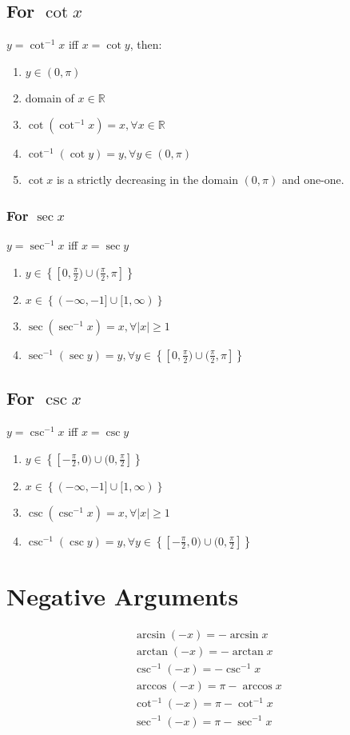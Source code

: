 \subsection{For $\cot x$}
$y=\cot^{-1} x$ iff $x=\cot y$, then:
\begin{enumerate}
	\item $y \in (0,\pi)$
	\item domain of $x \in \mathbb{R}$
	\item $\cot(\cot^{-1} x)=x,\forall x\in\mathbb{R}$
	\item $\cot^{-1}(\cot y)=y, \forall y\in (0,\pi)$
	\item $\cot x$ is a strictly decreasing in the domain $(0,\pi)$ and one-one.
\end{enumerate}

\subsubsection{For $\sec x$}
$y=\sec^{-1} x$ iff $x=\sec y$
\begin{enumerate}
	\item $y\in\left\lbrace [0,\frac{\pi}{2})\cup(\frac{\pi}{2},\pi]\right\rbrace$
	\item $x\in\left\lbrace(-\infty,-1]\cup[1,\infty)\right\rbrace$
	\item $\sec(\sec^{-1}x)=x,\forall \lvert x \rvert \geq 1$
	\item $\sec^{-1}(\sec y)=y, \forall y \in \left\lbrace [0,\frac{\pi}{2})\cup(\frac{\pi}{2},\pi]\right\rbrace$
\end{enumerate}

\subsection{For $\csc x$}
$y=\csc^{-1} x$ iff $x=\csc y$
\begin{enumerate}
	\item $y\in\left\lbrace [-\frac{\pi}{2},0)\cup(0,\frac{\pi}{2}]\right\rbrace$
	\item $x\in\left\lbrace(-\infty,-1]\cup[1,\infty)\right\rbrace$
	\item $\csc(\csc^{-1}x)=x,\forall \lvert x \rvert \geq 1$
	\item $\csc^{-1}(\csc y)=y, \forall y \in \left\lbrace [-\frac{\pi}{2},0)\cup(0,\frac{\pi}{2}]\right\rbrace$
\end{enumerate}

\section{Negative Arguments}
\begin{align}
	\arcsin (-x)=-\arcsin x\\
	\arctan (-x)=-\arctan x\\
	\csc^{-1} (-x)=-\csc^{-1} x\\
	\arccos (-x)=\pi-\arccos x\\
	\cot^{-1} (-x)=\pi-\cot^{-1} x\\
	\sec^{-1} (-x)=\pi-\sec^{-1} x
\end{align}

